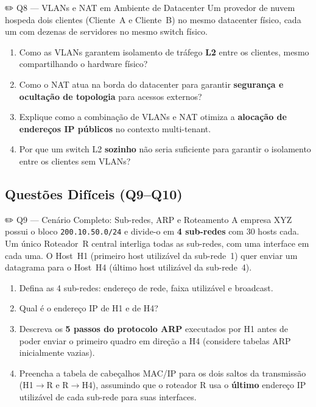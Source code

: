 \documentclass[11pt,a4paper]{article}
\begin{document}
\begin{questao}{✏️ Q8 --- VLANs e NAT em Ambiente de Datacenter}
Um provedor de nuvem hospeda dois clientes (Cliente~A e Cliente~B) no mesmo datacenter físico, cada um com dezenas de servidores no mesmo switch físico.
\begin{enumerate}[label=(\alph*)]
    \item Como as VLANs garantem isolamento de tráfego \textbf{L2} entre os clientes, mesmo compartilhando o hardware físico?
    \item Como o NAT atua na borda do datacenter para garantir \textbf{segurança e ocultação de topologia} para acessos externos?
    \item Explique como a combinação de VLANs e NAT otimiza a \textbf{alocação de endereços IP públicos} no contexto multi-tenant.
    \item Por que um switch L2 \textbf{sozinho} não seria suficiente para garantir o isolamento entre os clientes sem VLANs?
\end{enumerate}
\end{questao}

\subsection*{Questões Difíceis (Q9--Q10)}

\begin{questao}{✏️ Q9 --- Cenário Completo: Sub-redes, ARP e Roteamento}
A empresa XYZ possui o bloco \texttt{200.10.50.0/24} e divide-o em \textbf{4 sub-redes} com 30 hosts cada. Um único Roteador~R central interliga todas as sub-redes, com uma interface em cada uma. O Host~H1 (primeiro host utilizável da sub-rede~1) quer enviar um datagrama para o Host~H4 (último host utilizável da sub-rede~4).
\begin{enumerate}[label=(\alph*)]
    \item Defina as 4 sub-redes: endereço de rede, faixa utilizável e broadcast.
    \item Qual é o endereço IP de H1 e de H4?
    \item Descreva os \textbf{5 passos do protocolo ARP} executados por H1 antes de poder enviar o primeiro quadro em direção a H4 (considere tabelas ARP inicialmente vazias).
    \item Preencha a tabela de cabeçalhos MAC/IP para os dois saltos da transmissão (H1$\to$R e R$\to$H4), assumindo que o roteador R usa o \textbf{último} endereço IP utilizável de cada sub-rede para suas interfaces.
\end{enumerate}
\end{questao}
\end{document}
